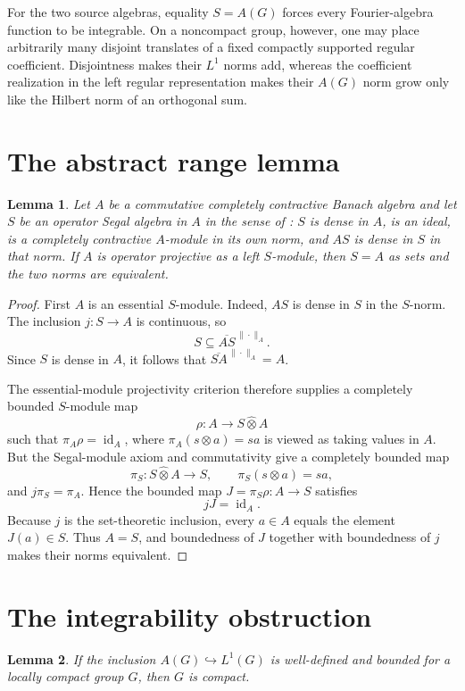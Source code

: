 \documentclass[11pt]{article}
\newtheorem{lemma}{Lemma}
\newcommand{\A}{A(G)}
\newcommand{\opten}{\widehat\otimes}
\begin{document}
For the two source algebras, equality $S=\A$ forces every Fourier-algebra function to be integrable.  On a noncompact group, however, one may place arbitrarily many disjoint translates of a fixed compactly supported regular coefficient.  Disjointness makes their $L^1$ norms add, whereas the coefficient realization in the left regular representation makes their $\A$ norm grow only like the Hilbert norm of an orthogonal sum.

\section*{The abstract range lemma}
\begin{lemma}\label{lem:range}
Let $A$ be a commutative completely contractive Banach algebra and let $S$ be an operator Segal algebra in $A$ in the sense of \cite{Source}: $S$ is dense in $A$, is an ideal, is a completely contractive $A$-module in its own norm, and $AS$ is dense in $S$ in that norm.  If $A$ is operator projective as a left $S$-module, then $S=A$ as sets and the two norms are equivalent.
\end{lemma}

\begin{proof}
First $A$ is an essential $S$-module.  Indeed, $AS$ is dense in $S$ in the $S$-norm.  The inclusion $j:S\to A$ is continuous, so
\[
 S\subseteq \overline{AS}^{\,\|\cdot\|_A}.
\]
Since $S$ is dense in $A$, it follows that $\overline{SA}^{\,\|\cdot\|_A}=A$.

The essential-module projectivity criterion \cite[Proposition 2.5]{Source} therefore supplies a completely bounded $S$-module map
\[
 \rho:A\longrightarrow S\opten A
\]
such that $\pi_A\rho=\operatorname{id}_A$, where $\pi_A(s\otimes a)=sa$ is viewed as taking values in $A$.  But the Segal-module axiom and commutativity give a completely bounded map
\[
 \pi_S:S\opten A\longrightarrow S,\qquad \pi_S(s\otimes a)=sa,
\]
and $j\pi_S=\pi_A$.  Hence the bounded map $J=\pi_S\rho:A\to S$ satisfies
\[
 jJ=\operatorname{id}_A.
\]
Because $j$ is the set-theoretic inclusion, every $a\in A$ equals the element $J(a)\in S$.  Thus $A=S$, and boundedness of $J$ together with boundedness of $j$ makes their norms equivalent.
\end{proof}

\section*{The integrability obstruction}
\begin{lemma}\label{lem:l1}
If the inclusion $\A\hookrightarrow L^1(G)$ is well-defined and bounded for a locally compact group $G$, then $G$ is compact.
\end{lemma}
\end{document}
